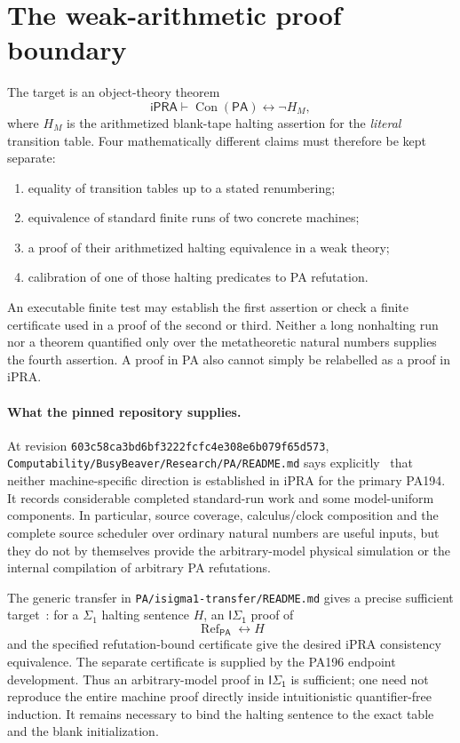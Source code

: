 \section{The weak-arithmetic proof boundary}
\label{sec:weak-audit}

The target is an object-theory theorem
\[
 \mathsf{iPRA}\vdash\operatorname{Con}(\mathsf{PA})
                  \leftrightarrow\neg H_M,
\]
where $H_M$ is the arithmetized blank-tape halting assertion for the
\emph{literal} transition table.  Four mathematically different claims
must therefore be kept separate:
\begin{enumerate}
\item equality of transition tables up to a stated renumbering;
\item equivalence of standard finite runs of two concrete machines;
\item a proof of their arithmetized halting equivalence in a weak theory;
\item calibration of one of those halting predicates to PA refutation.
\end{enumerate}
An executable finite test may establish the first assertion or check a
finite certificate used in a proof of the second or third.  Neither a long
nonhalting run nor a theorem quantified only over the metatheoretic natural
numbers supplies the fourth assertion.  A proof in PA also cannot simply
be relabelled as a proof in iPRA.

\paragraph{What the pinned repository supplies.}
At revision \texttt{603c58ca3bd6bf3222fcfc4e308e6b079f65d573},
\texttt{Computability/BusyBeaver/Research/PA/README.md} says explicitly~\cite{pa-status}
that neither machine-specific direction is established in iPRA for the
primary PA194.  It records considerable completed standard-run work and
some model-uniform components.  In particular, source coverage,
calculus/clock composition and the complete source scheduler over ordinary
natural numbers are useful inputs, but they do not by themselves provide
the arbitrary-model physical simulation or the internal compilation of
arbitrary PA refutations.

The generic transfer in
\texttt{PA/isigma1-transfer/README.md} gives a precise sufficient target~\cite{transfer}:
for a $\Sigma_1$ halting sentence $H$, an
$\mathsf{I\Sigma_1}$ proof of
\[
 \operatorname{Ref}_{\mathsf{PA}}\leftrightarrow H
\]
and the specified refutation-bound certificate give the desired iPRA
consistency equivalence.  The separate certificate is supplied by the
PA196 endpoint development.  Thus an arbitrary-model proof in
$\mathsf{I\Sigma_1}$ is sufficient; one need not reproduce the entire
machine proof directly inside intuitionistic quantifier-free induction.
It remains necessary to bind the halting sentence to the exact table and
the blank initialization.

